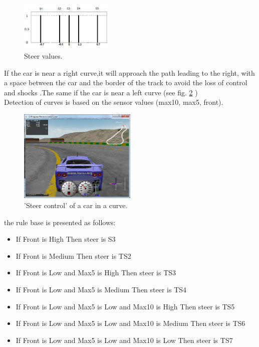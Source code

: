 \documentclass{llncs}
\begin{document}
\begin{enumerate}
	
	\begin{figure}[h!]
		
		\centering
		\includegraphics[width=0.4\textwidth]{fig/speed2.PNG}
		\begin{minipage}{10cm}
			\centering
			\caption{\footnotesize Steer values.}
			\label{fontfig6}
		\end{minipage} 
	\end{figure}
	
	
	
	If the car is near a right curve,it will approach the path leading to the right, with a space between the car and the border of the track to avoid the loss of control and shocks .The same if the car is near a left curve (see fig. \ref {steercont} ) \\
	
	Detection of curves is based on the sensor values (max10, max5, front).
	
	\begin{figure}[h!]
		
		\centering
		\includegraphics[width=0.5\textwidth]{fig/steercont.PNG}
		\begin{minipage}{10cm}
			\centering
			\caption{\footnotesize 'Steer control' of a car in a curve.}
			\label{steercont}
		\end{minipage} 
	\end{figure}
	the rule base is presented as follows:\\
	\begin{itemize}
		
		\item If Front is High Then steer is S3
		\item If Front is Medium Then steer is TS2
		\item If Front is Low and Max5 is High Then steer is TS3
		\item If Front is Low and Max5 is Medium Then steer is TS4
		\item If Front is Low and Max5 is Low and Max10 is High Then steer is TS5
		\item If Front is Low and Max5 is Low and Max10 is Medium Then steer is TS6
		\item  If Front is Low and Max5 is Low and Max10 is Low Then steer is TS7
		\\
	\end{itemize}	
\end{enumerate}	
\end{document}
